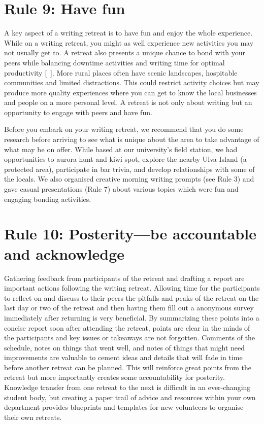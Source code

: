 \documentclass[10pt,letterpaper]{article}
\begin{document}
\section*{Rule 9: Have fun}

A key aspect of a writing retreat is to have fun and enjoy the whole experience. While on a writing retreat, you might as well experience new activities you may not usually get to. A retreat also presents a unique chance to bond with your peers while balancing downtime activities and writing time for optimal productivity [~\cite{eardley2021, lyubykh}]. More rural places often have scenic landscapes, hospitable communities and limited distractions. This could restrict activity choices but may produce more quality experiences where you can get to know the local businesses and people on a more personal level. A retreat is not only about writing but an opportunity to engage with peers and have fun.

Before you embark on your writing retreat, we recommend that you do some research before arriving to see what is unique about the area to take advantage of what may be on offer. While based at our university's field station, we had opportunities to aurora hunt and kiwi spot, explore the nearby Ulva Island (a protected area), participate in bar trivia, and develop relationships with some of the locals. We also organised creative morning writing prompts (see Rule 3) and gave casual presentations (Rule 7) about various topics which were fun and engaging bonding activities.

\section*{Rule 10: Posterity---be accountable and acknowledge}

Gathering feedback from participants of the retreat and drafting a report are important actions following the writing retreat. Allowing time for the participants to reflect on and discuss to their peers the pitfalls and peaks of the retreat on the last day or two of the retreat and then having them fill out a anonymous survey immediately after returning is very beneficial. By summarizing these points into a concise report soon after attending the retreat, points are clear in the minds of the participants and key issues or takeaways are not forgotten. Comments of the schedule, notes on things that went well, and notes of things that might need improvements are valuable to cement ideas and details that will fade in time before another retreat can be planned. This will reinforce great points from the retreat but more importantly creates some accountability for posterity. Knowledge transfer from one retreat to the next is difficult in an ever-changing student body, but creating a paper trail of advice and resources within your own department provides blueprints and templates for new volunteers to organise their own retreats.
\end{document}
